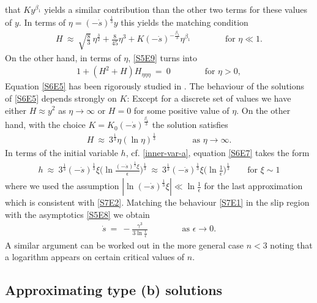 \documentclass[pagesize,pdftex]{amsart}
\newcommand{\bet}{\beta}
\newcommand{\gam}{\gamma}
\newcommand{\eps}{\epsilon}
\begin{document}
that $Ky^{\bet_1}$ yields a similar contribution than the other two terms for
these values of $y$. In terms of $\eta =(-\dot s)^{\frac 13}y$ this yields the
matching condition
\begin{align} \label{S6E6} %
  H \ \approx \ \sqrt{\tfrac 83} \, \eta^{\frac 32}+ \frac{8}{45}\eta^3+K(-\dot
  s)^{-\frac{\bet_1}3}\eta^{\bet_1} \qquad\qquad %
  \text{for $\eta \ll 1$.}
\end{align}
On the other hand, in terms of $\eta$, \eqref{S5E9} turns into %
\begin{align}
  1+ (H^2+H) H_{\eta \eta \eta } \ %
  = \ 0 \qquad\qquad %
  \text{for $\eta >0$},  \label{S6E5}
\end{align}%
Equation \eqref{S6E5} has been rigorously studied in
\cite{GiacomelliOtto-2002,GnannWisse-2022}. The behaviour of the solutions
of \eqref{S6E5} depends strongly on $K$: Except for a discrete set of values we
have either $H \approx y^2$ as $\eta \to \infty$ or $H =0$ for some positive
value of $\eta$. On the other hand, with the choice
$K=K_{0}\left(-\dot s \right)^{\frac{\bet_1}3}$ the solution satisfies
\begin{align}
  H \ %
  \approx  \ 3^{\frac 13}\eta (\ln \eta)^{\frac 13}\ \qquad\qquad %
  \text{as $\eta \to \infty$}.   \label{S6E7}
\end{align}
In terms of the initial variable $h$, cf. \eqref{inner-var-a}, equation \eqref{S6E7}
takes the form
\begin{align} \label{S7E1} %
  h \ %
  \approx \ 3^{\frac 13} (-\dot s)^{\frac 13}\xi \Big(\ln \frac {(-\dot
  s)^{\frac 13}\xi}{\eps} \Big)^{\frac 13} \ %
  \approx \ 3^{\frac 13} (-\dot s)^{\frac 13}\xi \big(\ln \frac 1\eps
  \big)^{\frac 13} \qquad %
  \text{for $\xi \sim 1$}
\end{align}
where we used the assumption $|\ln (-\dot s)^{\frac 13}\xi| \ll \ln \frac 1\eps$
for the last approximation which is consistent with \eqref{S7E2}.  Matching the
behaviour \eqref{S7E1} in the slip region with the asymptotics \eqref{S5E8} we
obtain
\begin{align}
  \dot s \ %
  = \ - \frac{\gam^3}{3 \ln \frac 1{\eps}} %
  \qquad\qquad \text{as $\eps \to 0$}.  \label{S7E2}
\end{align}
A similar argument can be worked out in the more general case $n < 3$ noting
that a logarithm appears on certain critical values of $n$.


\subsection{Approximating type (b) solutions \label{MatchTypeb}}
\end{document}
